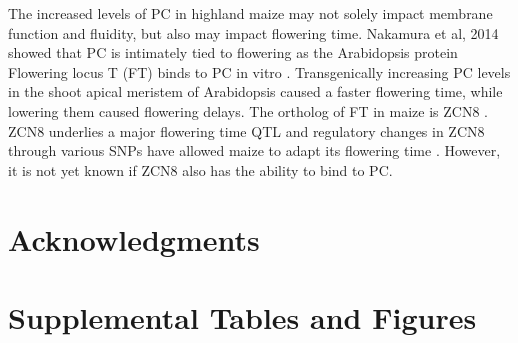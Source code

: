 \documentclass[9pt,twocolumn,twoside,lineno]{gsajnl}
\begin{document}
The increased levels of PC in highland maize may not solely impact membrane function and fluidity, but also may impact flowering time. Nakamura et al, 2014 showed that PC is intimately tied to flowering as the Arabidopsis protein Flowering locus T (FT) binds to PC in vitro \cite{Nakamura2014-qf}.  Transgenically increasing PC levels in the shoot apical meristem of Arabidopsis caused a faster flowering time, while lowering them caused flowering delays. The ortholog of FT in maize is ZCN8 \cite{Lazakis2011-nq}. ZCN8 underlies a major flowering time QTL and regulatory changes in ZCN8 through various SNPs have allowed maize to adapt its flowering time \cite{Guo2019-pn}. However, it is not yet known if ZCN8 also has the ability to bind to PC.

\section{Acknowledgments}
\label{sec:acknowledgments}



\newpage  


\section*{Supplemental Tables and Figures}

\renewcommand{\thefigure}{S\arabic{figure}}
\renewcommand{\thetable}{S\arabic{table}}%
\linenumbers

\setcounter{figure}{0}
\setcounter{table}{0}
\end{document}
